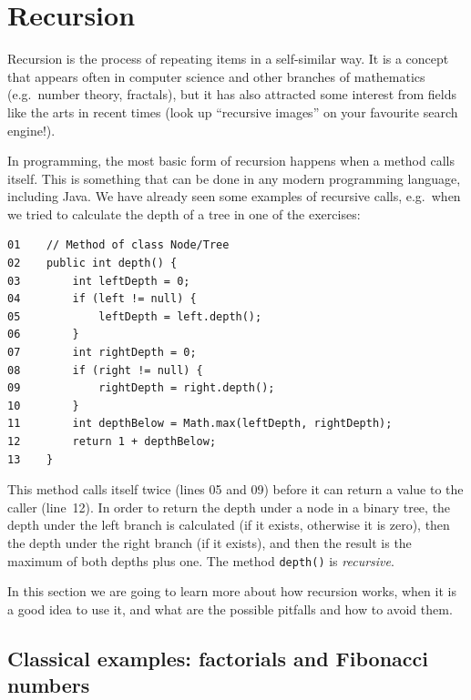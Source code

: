 
\section{Recursion}
\label{sec:recursion}

Recursion is the process of repeating items in a self-similar way. It
is a concept that appears often in computer science and other branches
of mathematics (e.g.~number theory, fractals), but it has also
attracted some interest from fields like the arts in recent times
(look up ``recursive images'' on your favourite search engine!). 

In programming, the most basic form of recursion happens when a method
calls itself. This is something that can be done in any modern 
programming language, including
Java. We have already seen some examples of recursive
calls, e.g.~when we tried to calculate the depth of a tree in one of
the exercises: 

\begin{verbatim}
01    // Method of class Node/Tree
02    public int depth() {
03        int leftDepth = 0;
04        if (left != null) {
05            leftDepth = left.depth();
06        }
07        int rightDepth = 0;
08        if (right != null) {
09            rightDepth = right.depth();
10        }
11        int depthBelow = Math.max(leftDepth, rightDepth);
12        return 1 + depthBelow;
13    }
\end{verbatim}

This method calls itself twice (lines 05 and 09) before it can return
a value to the caller (line~12). 
In order to return the depth under a node in a binary tree,
the depth under the left branch is calculated (if it exists, otherwise
it is zero), then the depth under the right 
branch (if it exists), and then the
result is the maximum of both depths plus one. The method
\verb+depth()+ is \emph{recursive}. 

In this section we are going to
learn more about how recursion works, when it is a good idea to use
it, and what are the possible pitfalls and how to avoid them. 

\subsection{Classical examples: factorials and Fibonacci numbers}
\label{sec:class-exampl-fact}

